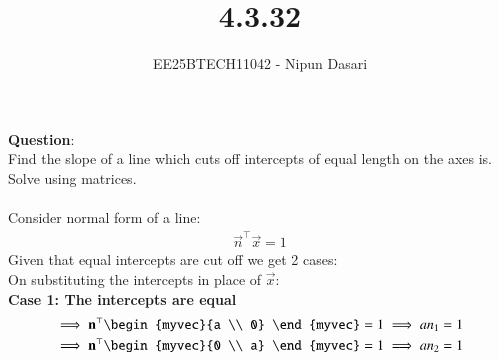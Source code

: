 \documentclass[journal]{IEEEtran}
\begin{document}
	
	
	\vspace{3cm}
	
	\title{4.3.32}
	\author{EE25BTECH11042 - Nipun Dasari}
	\maketitle
		
	\renewcommand{\thefigure}{\theenumi}
	\renewcommand{\thetable}{\theenumi}
	\setlength{\intextsep}{10pt} %
	
	
	\renewcommand{\thetable}{\theenumi}
	
	\textbf{Question}:\\
	Find the slope of a line which cuts off intercepts of equal length on the axes is. Solve using matrices. \\ 
	\solution \\
	Consider normal form of a line:
	\begin{align}
		\vec{n}^\top\vec{x} = 1
	\end{align}
	Given that equal intercepts are cut off we get 2 cases:\\
	On substituting the intercepts in place of $\vec{x}$: \\
	\textbf{Case 1: The intercepts are equal }
	\begin{align}
		\implies  \vec{n}^\top\begin{myvec}{a \\ 0} \end{myvec} = 1 \implies an_1 = 1 \label{0.2}\\
		\implies \vec{n}^\top\begin{myvec}{0 \\ a} \end{myvec} = 1 \implies an_2 = 1 \label{0.3} \\
	\end{align}
	
\end{document}
